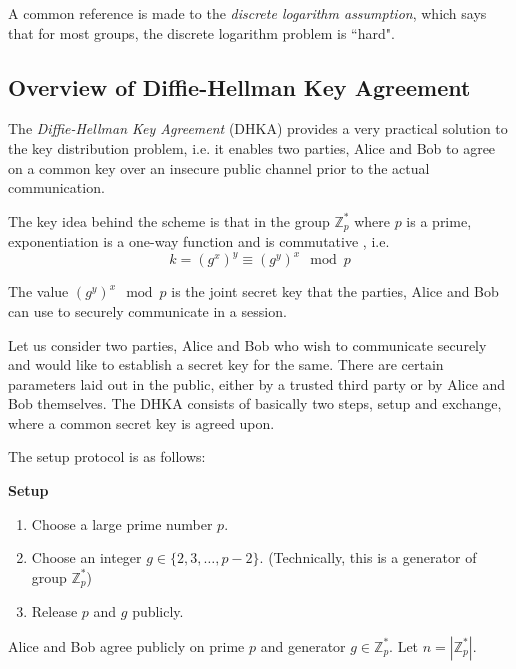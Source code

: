A common reference is made to the \textit{discrete logarithm assumption}, which says that for most groups, the discrete logarithm problem is ``hard".

\subsection{Overview of Diffie-Hellman Key Agreement}

\label{subsec:dhka} 

The \emph{Diffie-Hellman Key Agreement} (DHKA) provides a very practical solution to the key distribution problem, i.e. it enables two parties, Alice and Bob to agree on a common key over an insecure public channel prior to the actual communication.

The key idea behind the scheme is that in the group \( \mathbb{Z}^*_p \) where \( p \) is a prime, exponentiation is a one-way function and is commutative \cite{paar2009understanding}, i.e.
\begin{equation}
    k = (g^x)^y \equiv (g^y)^x \mod p
\end{equation}

The value \( (g^y)^x \mod p \) is the joint secret key that the parties, Alice and Bob can use to securely communicate in a session.

Let us consider two parties, Alice and Bob who wish to communicate securely and would like to establish a secret key for the same. 
There are certain parameters laid out in the public, either by a trusted third party or by Alice and Bob themselves. 
The DHKA consists of basically two steps, setup and exchange, where a common secret key is agreed upon.

The setup protocol is as follows:

\begin{tcolorbox}
\textbf{Setup} 

\begin{enumerate}
    \item Choose a large prime number \( p \).
    \item Choose an integer \( g \in \{2, 3, \ldots , p-2\} \). (Technically, this is a generator of group \( \mathbb{Z}^*_p \))
    \item Release \( p \) and \( g \) publicly.
\end{enumerate}
\end{tcolorbox}

Alice and Bob agree publicly on prime \( p \) and generator \( g \in \mathbb{Z}^*_p \). 
Let \( n = |\mathbb{Z}^*_p| \).

